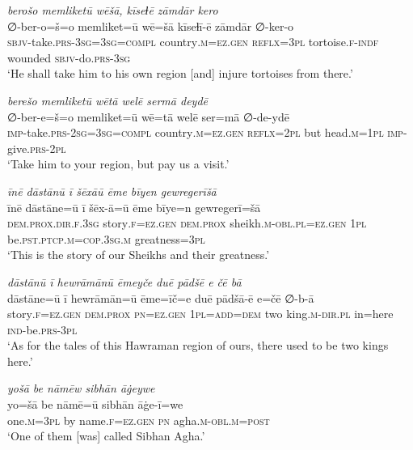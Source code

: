 \ea \label{DG.65}
\textit{berošo memliketū wēšā, kīseɫē zāmdār kero} \\ 
\gll ∅-ber-o=š=o memliket=ū wē=šā kīseɫī-ē zāmdār ∅-ker-o \\ 
 \textsc{sbjv-}take\textsc{.prs}\textsc{-3sg}\textsc{=3sg}\textsc{=\textsc{compl}} country\textsc{.m}\textsc{=ez}\textsc{.gen} \textsc{reflx}\textsc{=3pl} tortoise\textsc{\textsc{.f}}\textsc{-indf} wounded \textsc{sbjv-}do\textsc{.prs}\textsc{-3sg} \\ 
\glt `He shall take him to his own region [and] injure tortoises from there.'
\z 
 
\ea \label{DG.68}
\textit{berešo memliketū wētā welē sermā deydē} \\ 
\gll ∅-ber-e=š=o memliket=ū wē=tā welē ser=mā ∅-de-ydē \\ 
 \textsc{imp-}take\textsc{.prs}-\textsc{2sg}\textsc{=3sg}\textsc{=\textsc{compl}} country\textsc{.m}\textsc{=ez}\textsc{.gen} \textsc{reflx}\textsc{=2pl} but head\textsc{.m}\textsc{=1pl} \textsc{imp-}give\textsc{.prs}\textsc{-2pl} \\ 
\glt `Take him to your region, but pay us a visit.'
\z 
 
\ea \label{DG.73}
\textit{īnē dāstānū ī šēxāū ēme bīyen gewregerīšā} \\ 
\gll īnē dāstāne=ū ī šēx-ā=ū ēme bīye=n gewregerī=šā \\ 
 \textsc{dem.prox}\textsc{.dir}\textsc{\textsc{.f}}\textsc{.3sg} story\textsc{\textsc{.f}}\textsc{=ez}\textsc{.gen} \textsc{dem.prox} sheikh\textsc{.m}\textsc{-obl}\textsc{.pl}=\textsc{ez.gen} \textsc{1pl} be\textsc{.pst}\textsc{.ptcp}\textsc{.m}\textsc{=cop}\textsc{.3sg}\textsc{.m} greatness\textsc{=3pl} \\ 
\glt `This is the story of our Sheikhs and their greatness.'
\z 
 

\ea \label{DP.1}
\textit{dāstānū ī hewrāmānū ēmeyče duē pādšē e čē bā} \\ 
\gll dāstāne=ū ī hewrāmān=ū ēme=īč=e duē pādšā-ē e=čē ∅-b-ā \\ 
 story\textsc{\textsc{.f}}\textsc{=ez}\textsc{.gen} \textsc{dem.prox} \textsc{pn}\textsc{=ez}\textsc{.gen} \textsc{1pl}\textsc{=add}\textsc{=dem} two king\textsc{.m}\textsc{-dir}\textsc{.pl} in=here \textsc{ind-}be\textsc{.prs}\textsc{-3pl} \\ 
\glt `As for the tales of this Hawraman region of ours, there used to be two kings here.'
\z 
 
\ea \label{DP.2}
\textit{yošā be nāmēw sibhān āġeywe} \\ 
\gll yo=šā be nāmē=ū sibhān āġe-ī=we \\ 
 one\textsc{.m}\textsc{=3pl} by name\textsc{\textsc{.f}}\textsc{=ez}\textsc{.gen} \textsc{pn} agha\textsc{.m}\textsc{-obl}\textsc{.m}\textsc{=\textsc{post}} \\ 
\glt `One of them [was] called Sibhan Agha.'
\z 
 
